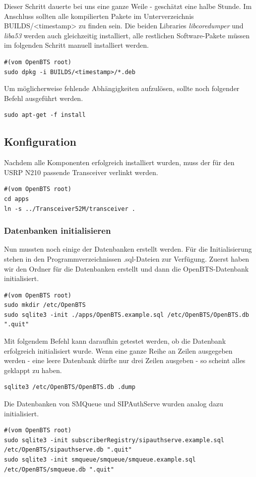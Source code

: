 Dieser Schritt dauerte bei uns eine ganze Weile - geschätzt eine halbe Stunde. Im Anschluss sollten alle kompilierten Pakete im Unterverzeichnis BUILDS/<timestamp> zu finden sein. Die beiden Libraries \textit{libcoredumper} und \textit{liba53} werden auch gleichzeitig installiert, alle restlichen Software-Pakete müssen im folgenden Schritt manuell installiert werden.
\begin{lstlisting}
#(vom OpenBTS root)
sudo dpkg -i BUILDS/<timestamp>/*.deb
\end{lstlisting}

Um möglicherweise fehlende Abhängigkeiten aufzulösen, sollte noch folgender Befehl ausgeführt werden.
\begin{lstlisting}
sudo apt-get -f install
\end{lstlisting}

\subsection{Konfiguration}
Nachdem alle Komponenten erfolgreich installiert wurden, muss der für den USRP N210 passende Transceiver verlinkt werden.
\begin{lstlisting}
#(vom OpenBTS root)
cd apps
ln -s ../Transceiver52M/transceiver .
\end{lstlisting}

\subsubsection{Datenbanken initialisieren}
Nun mussten noch einige der Datenbanken erstellt werden. Für die Initialisierung stehen in den Programmverzeichnissen .sql-Dateien zur Verfügung. Zuerst haben wir den Ordner für die Datenbanken erstellt und dann die OpenBTS-Datenbank initialisiert.
\begin{lstlisting}
#(vom OpenBTS root)
sudo mkdir /etc/OpenBTS
sudo sqlite3 -init ./apps/OpenBTS.example.sql /etc/OpenBTS/OpenBTS.db ".quit"
\end{lstlisting}

Mit folgendem Befehl kann daraufhin getestet werden, ob die Datenbank erfolgreich initialisiert wurde. Wenn eine ganze Reihe an Zeilen ausgegeben werden - eine leere Datenbank dürfte nur drei Zeilen ausgeben - so scheint alles geklappt zu haben.
\begin{lstlisting}
sqlite3 /etc/OpenBTS/OpenBTS.db .dump
\end{lstlisting}

Die Datenbanken von SMQueue und SIPAuthServe wurden analog dazu initialisiert.
\begin{lstlisting}
#(vom OpenBTS root)
sudo sqlite3 -init subscriberRegistry/sipauthserve.example.sql /etc/OpenBTS/sipauthserve.db ".quit"
sudo sqlite3 -init smqueue/smqueue/smqueue.example.sql /etc/OpenBTS/smqueue.db ".quit"
\end{lstlisting}


